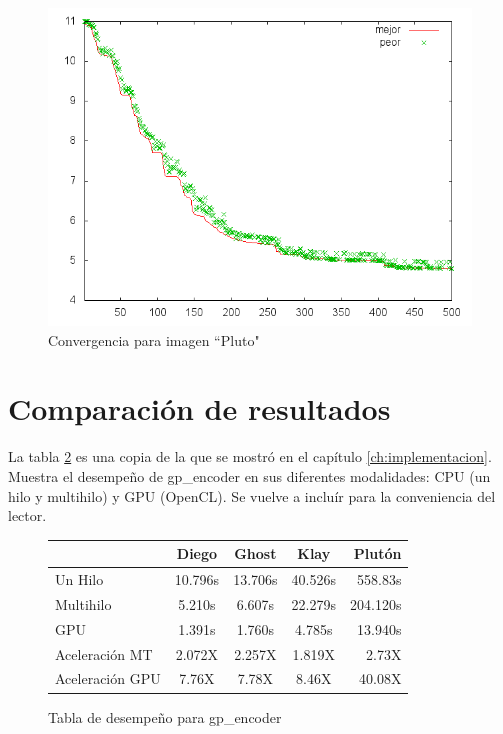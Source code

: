 \begin{figure}[b]
    \includegraphics[width=1.0\textwidth]{plot_pluto}
    \caption{Convergencia para imagen ``Pluto"}
    \label{img:plot-pluto}
\end{figure}

\section{Comparación de resultados}

La tabla \ref{table:perf_table} es una copia de la que se mostró en el capítulo
\ref{ch:implementacion}. Muestra el desempeño de gp\_encoder en sus diferentes
modalidades: CPU (un hilo y multihilo) y GPU (OpenCL). Se vuelve a incluír para
la conveniencia del lector.

\begin{figure}[h!]
    \caption{Tabla de desempeño para gp\_encoder}
    \begin{tabular}{ |l c c c r | }
        \hline
                        & Diego & Ghost & Klay & Plutón \\
        \hline
        Un Hilo         & 10.796s  & 13.706s   & 40.526s &   558.83s  \\
        Multihilo       &  5.210s  & 6.607s    & 22.279s &  204.120s  \\
        GPU             &   1.391s & 1.760s   & 4.785s   &  13.940s   \\
        Aceleración MT  &  2.072X  & 2.257X  & 1.819X    &  2.73X    \\
        Aceleración GPU &   7.76X  & 7.78X  & 8.46X      &  40.08X   \\
        \hline
    \end{tabular}
    \label{table:perf_table}
\end{figure}

